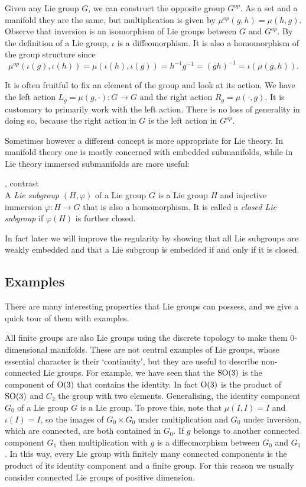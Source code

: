 Given any Lie group $G$, we can construct the opposite group $G^{op}$.
As a set and a manifold they are the same, but multiplication is given by $\mu^{op}(g,h) = \mu(h,g)$.
Observe that inversion is an isomorphism of Lie groups between $G$ and $G^{op}$.
By the definition of a Lie group, $\iota$ is a diffeomorphism.
It is also a homomorphism of the group structure since
\[
\mu^{op}(\iota(g),\iota(h))
= \mu(\iota(h),\iota(g))
= h^{-1}g^{-1}
= (gh)^{-1}
= \iota(\mu(g,h)).
\]

It is often fruitful to fix an element of the group and look at its action.
We have the left action $L_g = \mu(g,\cdot) : G \to G$ and the right action $R_g = \mu(\cdot,g)$.
It is customary to primarily work with the left action.
There is no loss of generality in doing so, because the right action in $G$ is the left action in $G^{op}$.

Sometimes however a different concept is more appropriate for Lie theory.
In manifold theory one is mostly concerned with embedded submanifolds, while in Lie theory immersed submanifolds are more useful:
\begin{definition}
\textup{\cite[3.17]{Warner1983}, contrast~\cite[\S{}7.1]{Fulton2004}}\\
A \emph{Lie subgroup} $(H,\varphi)$ of a Lie group $G$ is a Lie group $H$ and injective immersion $\varphi : H \to G$ that is also a homomorphism.
It is called a \emph{closed Lie subgroup} if $\varphi(H)$ is further closed.
\end{definition}

In fact later we will improve the regularity by showing that all Lie subgroups are weakly embedded and that a Lie subgroup is embedded if and only if it is closed.






\subsection{Examples}

There are many interesting properties that Lie groups can possess, and we give a quick tour of them with examples.

All finite groups are also Lie groups using the discrete topology to make them $0$-dimensional manifolds.
These are not central examples of Lie groups, whose essential character is their `continuity', but they are useful to describe non-connected Lie groups.
For example, we have seen that the $\mathrm{SO}(3)$ is the component of $\mathrm{O}(3)$ that contains the identity.
In fact $\mathrm{O}(3)$ is the product of $\mathrm{SO}(3)$ and $C_2$ the group with two elements.
Generalising, the identity component $G_0$ of a Lie group $G$ is a Lie group.
To prove this, note that $\mu(I,I) = I$ and $\iota(I) = I$, so the images of $G_0\times G_0$ under multiplication and $G_0$ under inversion, which are connected, are both contained in $G_0$.
If $g$ belongs to another connected component $G_1$ then multiplication with $g$ is a diffeomorphism between $G_0$ and $G_1$.
In this way, every Lie group with finitely many connected components is the product of its identity component and a finite group.
For this reason we usually consider connected Lie groups of positive dimension.

